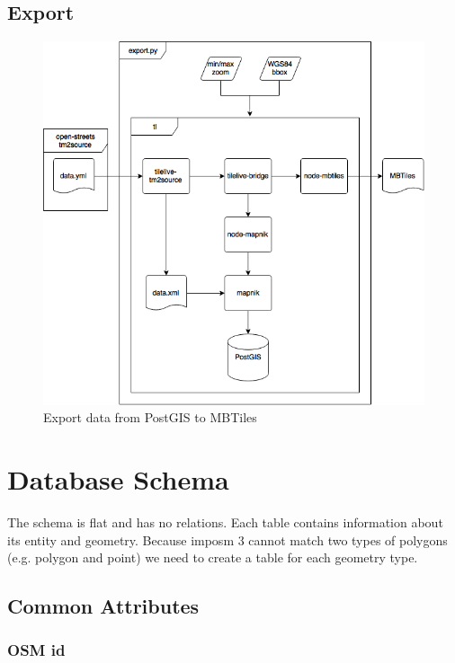 \subsection{Export}\label{workflow-export}

\begin{figure}[h]
  \includegraphics[scale=0.6]{images/export_flow.png}
  \caption{Export data from PostGIS to MBTiles}
\end{figure}

\section{Database Schema}\label{database-schema}


The schema is flat and has no relations. Each table contains
information about its entity and geometry. Because imposm 3
cannot match two types of polygons (e.g. polygon and point) we need
to create a table for each geometry type.


\subsection{Common Attributes}

\subsubsection{OSM id}

